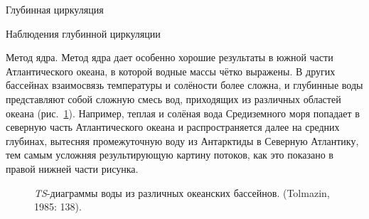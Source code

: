 \begin{chapter}{Глубинная циркуляция}
\begin{section}{Наблюдения глубинной циркуляции}
\begin{paragraph}{Метод ядра.}
Метод ядра дает особенно хорошие результаты в южной части Атлантического
океана, в которой водные массы чётко выражены. В других бассейнах 
взаимосвязь температуры и солёности более сложна, и глубинные воды
представляют собой сложную смесь вод, приходящих из различных областей 
океана (рис.~\ref{fig:TSplots}). Например, теплая и солёная вода Средиземного
моря попадает в северную часть Атлантического океана и распространяется далее
на средних глубинах, вытесняя промежуточную воду из Антарктиды в Северную
Атлантику, тем самым усложняя результирующую картину потоков, как это показано
в правой нижней части рисунка.
%

\begin{figure}[t!]
\begin{centering}
\end{centering}
\caption{\emph{TS}-диаграммы воды из различных океанских бассейнов. 
(Tolmazin, 1985: 138).}
\label{fig:TSplots}
\end{figure}
%
%
\end{paragraph}


\end{section}
\end{chapter}
